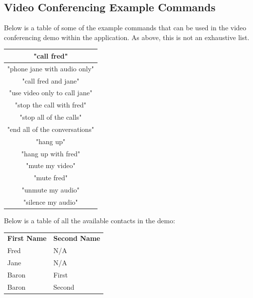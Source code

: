 \documentclass[11pt]{article}
\begin{document}
\newpage
\subsection{Video Conferencing Example Commands}
\label{appendix:call-examples}

Below is a table of some of the example commands that can be used in the video conferencing demo within the application. As above, this is not an exhaustive list.

\begin{table}[H]
\centering
\begin{tabular}{|c|}
\hline
"call fred"                    \\ \hline
"phone jane with audio only"   \\ \hline
"call fred and jane"           \\ \hline
"use video only to call jane"  \\ \hline
"stop the call with fred"      \\ \hline
"stop all of the calls"        \\ \hline
"end all of the conversations" \\ \hline
"hang up"                      \\ \hline
"hang up with fred"            \\ \hline
"mute my video"                \\ \hline
"mute fred"                    \\ \hline
"unmute my audio"              \\ \hline
"silence my audio"             \\ \hline
\end{tabular}
\end{table}

Below is a table of all the available contacts in the demo:

\begin{table}[H]
\centering
\begin{tabular}{ll}
\textbf{First Name} & \textbf{Second Name} \\
Fred                & N/A                  \\
Jane                & N/A                  \\
Baron               & First                \\
Baron               & Second              
\end{tabular}
\end{table}

\newpage
\end{document}
